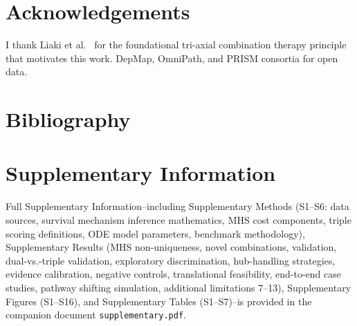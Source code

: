 \documentclass[11pt]{article}
\newenvironment{acknowledgements}{\section*{Acknowledgements}}{}
\begin{document}
\begin{acknowledgements}
I thank Liaki et al.~\cite{Liaki2025} for the foundational tri-axial combination therapy principle that motivates this work. DepMap, OmniPath, and PRISM consortia for open data.
\end{acknowledgements}

\section*{Bibliography}



\section*{Supplementary Information}
Full Supplementary Information--including Supplementary Methods (S1--S6: data sources, survival mechanism inference mathematics, MHS cost components, triple scoring definitions, ODE model parameters, benchmark methodology), Supplementary Results (MHS non-uniqueness, novel combinations, validation, dual-vs.-triple validation, exploratory discrimination, hub-handling strategies, evidence calibration, negative controls, translational feasibility, end-to-end case studies, pathway shifting simulation, additional limitations 7--13), Supplementary Figures (S1--S16), and Supplementary Tables (S1--S7)--is provided in the companion document \texttt{supplementary.pdf}.
\end{document}
